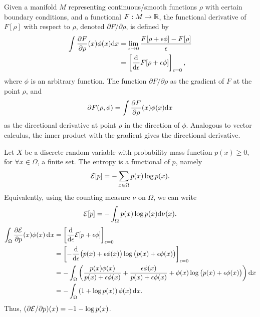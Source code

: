 \begin{definition}
  Given a manifold $M$ representing continuous/smooth functions $\rho$ with certain boundary conditions, and a functional $F:M\to\mathbb{R}$, the functional derivative of $F[\rho]$ with respect to $\rho$, denoted $\partial F/\partial\rho$, is defined by
  \begin{align*}
    \int \frac{\partial F}{\partial\rho}(x)\phi(x)\text{d} x
    &= \lim_{\epsilon\to 0} \frac{F[\rho + \epsilon\phi] - F[\rho]}{\epsilon} \\
    &= \left[ \frac{\text{d}}{\text{d} \epsilon} F[\rho + \epsilon\phi] \right]_{\epsilon=0},
  \end{align*}
  where $\phi$ is an arbitrary function.
  The function $\partial F/\partial\rho$ as the gradient of $F$ at the point $\rho$, and
  \[
    \partial F(\rho,\phi) = \int \frac{\partial F}{\partial\rho}(x)\phi(x) \text{d} x
  \]
  as the directional derivative at point $\rho$ in the direction of $\phi$.
  Analogous to vector calculus, the inner product with the gradient gives the directional derivative.
\end{definition}

\begin{example}
  Let $X$ be a discrete random variable with probability mass function $p(x) \geq 0$, for $\forall x \in \Omega$, a finite set.
  The entropy is a functional of $p$, namely
  \[
    {\mathcal E}[p] = - \sum_{x\in\Omega} p(x)\log p(x).
  \]
  Equivalently, using the counting measure $\nu$ on $\Omega$, we can write
  \[
    {\mathcal E}[p] = -\int_\Omega p(x) \log p(x) \text{d}\nu(x).
  \]
  \begin{align*}
    \int_\Omega \frac{\partial{\mathcal E}}{\partial p}(x)\phi(x) \operatorname{d}\hspace{0.5pt}\! x
    &= \left[ \frac{\text{d}}{\text{d} \epsilon} {\mathcal E}[p +  \epsilon\phi] \right]_{\epsilon=0} \\
    &= \left[ -\frac{\text{d}}{\text{d} \epsilon} 
    \big( p(x) + \epsilon\phi(x) \big) 
    \log \big(p(x) + \epsilon\phi(x) \big) 
    \right]_{\epsilon=0} \\
    &= -\int_\Omega \left( 
    \frac{p(x)\phi(x)}{p(x)+\epsilon\phi(x)}
    + \frac{\epsilon\phi(x)}{p(x) + \epsilon\phi(x)}
    + \phi(x)\log\big( p(x) + \epsilon\phi(x) \big)
    \right) \text{d} x \\
    &= -\int_\Omega \left( 1 + \log p(x) \right) \phi(x) \operatorname{d}\hspace{0.5pt}\! x.
  \end{align*}
  Thus, $(\partial{\mathcal E}/\partial p)(x) = -1 -\log p(x)$.
\end{example}


